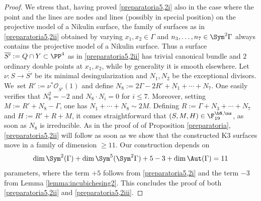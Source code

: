 \begin{proof}
We stress that, having proved \eqref{preparatoria5,2i} also in the case where the point and the lines are nodes and lines (possibly in special position) on the projective model of a Nikulin surface, the family of surfaces as in \eqref{preparatoria5,2ii} obtained by varying $x_1,x_2 \in \Gamma$ and $n_3,\ldots,n_7\in \Sym^2\Gamma$ always contains the projective model of a Nikulin surface.
Thus a surface $\overline{S'}:= Q\cap Y\subset \PP^4$ as in \eqref{preparatoria5,2ii} has trivial canonical bundle and $2$ ordinary double points at $x_1,x_2$, while by generality it is smooth elsewhere. Let $\nu:S\to \overline{S'}$ be its minimal desingularization and $N_1,N_2$ be the exceptional divisors. We~set $R':=\nu^*\mathcal O_{\overline{S'}}(1)$ and define $N_8:=2\Gamma-2R'+N_1+\cdots+N_7$. One easily verifies that $N_8^2=-2$ and
$N_8 \cdot N_i=0$ for $i\leq 7$. Moreover, setting $M:=R'+N_8-\Gamma$, one has
$N_1+\cdots+N_8 \sim 2M$. Defining $R:=\Gamma+N_3+\cdots+N_7$ and $H:=R'+R+M$, it comes straightforward that $(S,M,H)\in \F_{19}^{\bN,\ns}$, as soon as $N_8$ is irreducible. As in the proof of of Proposition \ref{preparatoria}, \eqref{preparatoria5,2ii} will
follow as soon as we show that the constructed K3 surfaces move in a family of dimension $\geq 11$. Our construction depends on
\[
\dim\Sym^2(\Gamma)+\dim \Sym^5(\Sym^2\Gamma)+5-3+\dim \Aut(\Gamma)=11
\]
parameters, where the term $+5$ follows from \eqref{preparatoria5,2i} and the term $-3$ from Lemma \ref{lemma:incubichesing2}. This concludes the proof of both \eqref{preparatoria5,2ii} and \eqref{preparatoria5,2iii}.
\end{proof}

